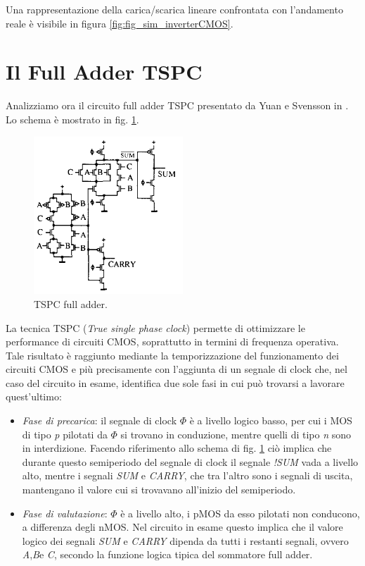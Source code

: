 Una rappresentazione della carica/scarica lineare confrontata con l'andamento reale è visibile in figura \ref{fig:fig_sim_inverterCMOS}.

\section{Il Full Adder TSPC}
\label{sec:sec_fullAdder}

Analizziamo ora il circuito full adder TSPC presentato da Yuan e Svensson in \cite{yuan1989high}. Lo schema è mostrato in fig. \ref{fig:fig_schemaDaArticolo}.

\begin{figure}[hbt!]
	\centering
	\includegraphics[width=0.5\textwidth]{figure/SchemaFullAdderTSPC_DaArticolo.PNG}
	\caption{TSPC full adder.}
	\label{fig:fig_schemaDaArticolo}
\end{figure}

La tecnica TSPC (\textit{True single phase clock}) permette di ottimizzare le performance di circuiti CMOS, soprattutto in termini di frequenza operativa. Tale risultato è raggiunto mediante la temporizzazione del funzionamento dei circuiti CMOS e più precisamente con l'aggiunta di un segnale di clock che, nel caso del circuito in esame, identifica due sole fasi in cui può trovarsi a lavorare quest'ultimo:

\begin{itemize}
	\item \textit{Fase di precarica}: il segnale di clock $\Phi$ è a livello logico basso, per cui i MOS di tipo \textit{p} pilotati da $\Phi$ si trovano in conduzione, mentre quelli di tipo \textit{n} sono in interdizione. Facendo riferimento allo schema di fig.  \ref{fig:fig_schemaDaArticolo} ciò implica che durante questo semiperiodo del segnale di clock il segnale \textit{!SUM} vada a livello alto, mentre i segnali \textit{SUM} e \textit{CARRY}, che tra l'altro sono i segnali di uscita, mantengano il valore cui si trovavano all'inizio del semiperiodo. 
	\item \textit{Fase di valutazione}: $\Phi$ è a livello alto, i pMOS da esso pilotati non conducono, a differenza degli nMOS. Nel circuito in esame questo implica che il valore logico dei segnali \textit{SUM} e \textit{CARRY} dipenda da tutti i restanti segnali, ovvero \textit{A},\textit{B}e \textit{C}, secondo la funzione logica tipica del sommatore full adder.
\end{itemize}

